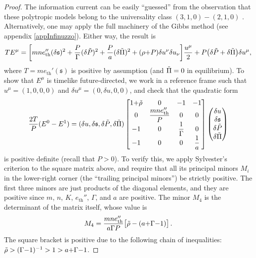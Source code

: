 \documentclass[a4paper, amsfonts, amssymb, amsmath, reprint, showkeys, nofootinbib, twoside,notitlepage,onecolumn]{revtex4-2}
\newcommand{\s}{{\mathfrak{s}}}
\theoremstyle{definition}
\theoremstyle{theorem}
\theoremstyle{corollary}
\begin{document}
\begin{proof}
The information current can be easily ``guessed'' from the observation that these polytropic models belong to the universality class $(3,1,0){-}(2,1,0)$ \cite{GavassinoUniversalityI2023,GavassinoUniversalityII2023}. Alternatively, one may apply the full machinery of the Gibbs method \cite{GavassinoGibbs2021,GavassinoCausality2021} (see appendix \ref{appInfinuzzo}). Either way, the result is 
\begin{equation}\label{EEE}
TE^\mu = \bigg[ mne_\text{th}''(\delta\s)^2+\dfrac{P}{\Gamma} (\delta \Tilde{P})^2 +\dfrac{P}{a} (\delta \Tilde{\Pi})^2+ (\rho{+}P) \delta u^\nu \delta u_\nu \bigg]\dfrac{u^\mu}{2}  +P\big( \delta \Tilde{P} +\delta \Tilde{\Pi} \big) \delta u^\mu ,
\end{equation}
where $T=me_\text{th}'(\s)$ is positive by assumption (and $\Tilde{\Pi}=0$ in equilibrium). To show that $E^\mu$ is timelike future-directed, we work in a reference frame such that
$u^\mu=(1,0,0,0)$ and $\delta u^\mu=(0,\delta u,0,0)$, and check that the quadratic form
\begin{equation}
\dfrac{2T}{P}(E^0-E^1) =(\delta u, \delta \s, \delta \Tilde{P}, \delta \Tilde{\Pi}) \begin{bmatrix}
1{+}\Tilde{\rho} & 0 & -1 & -1\\
0 & \dfrac{mne_\text{th}''}{P} & 0 & 0\\
-1 & 0 & \dfrac{1}{\Gamma} & 0\\
-1 & 0 & 0 & \dfrac{1}{a}\\
\end{bmatrix}
\begin{pmatrix}
\delta u \\
\delta \s \\
\delta \Tilde{P} \\
\delta \Tilde{\Pi} \\
\end{pmatrix}
\end{equation}
is positive definite (recall that $P>0$). To verify this, we apply Sylvester's criterion \cite[Theorem 7.2.5]{horn_johnson_1985} to the square matrix above, and require that all its principal minors $M_i$ in the lower-right corner (the ``trailing principal minors'') be strictly positive. The first three minors are just products of the diagonal elements, and they are positive since $m$, $n$, $K$, $e_\text{th}''$, $\Gamma$, and $a$ are positive. The minor $M_4$ is the determinant of the matrix itself, whose value is
\begin{equation}
M_4 = \dfrac{mne''_\text{th}}{a\Gamma P}\big[\Tilde{\rho}-(a{+}\Gamma{-}1) \big] \, . 
\end{equation}
The square bracket is positive due to the following chain of inequalities:
$\Tilde{\rho}>(\Gamma{-}1)^{-1}>1>a{+}\Gamma{-}1$.
\end{proof}
\end{document}
